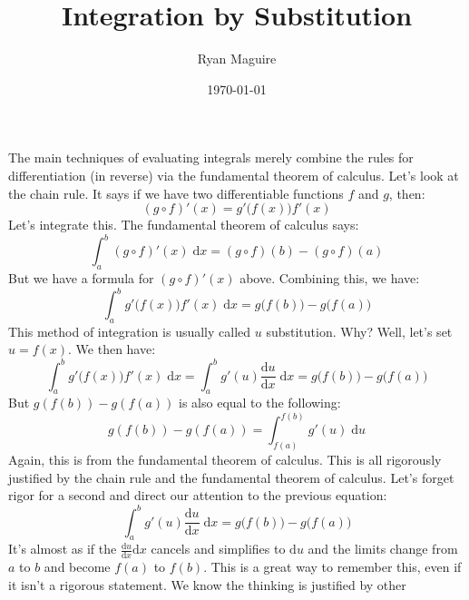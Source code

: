 \documentclass{article}
\title{Integration by Substitution}
\author{Ryan Maguire}
\date{\today}
\begin{document}
    \maketitle
    The main techniques of evaluating integrals merely combine the rules for
    differentiation (in reverse) via the fundamental theorem of calculus. Let's
    look at the chain rule. It says if we have two differentiable functions
    $f$ and $g$, then:
    \begin{equation}
        (g\circ{f})'(x)=g'\big(f(x)\big)f'(x)
    \end{equation}
    Let's integrate this. The fundamental theorem of calculus says:
    \begin{equation}
        \int_{a}^{b}(g\circ{f})'(x)\;\textrm{d}x
            =(g\circ{f})(b)-(g\circ{f})(a)
    \end{equation}
    But we have a formula for $(g\circ{f})'(x)$ above. Combining this, we have:
    \begin{equation}
        \int_{a}^{b}g'\big(f(x)\big)f'(x)\;\textrm{d}x
            =g\big(f(b)\big)-g\big(f(a)\big)
    \end{equation}
    This method of integration is usually called $u$ substitution. Why?
    Well, let's set $u=f(x)$. We then have:
    \begin{equation}
        \int_{a}^{b}g'\big(f(x)\big)f'(x)\;\textrm{d}x
            =\int_{a}^{b}g'(u)\frac{\textrm{d}u}{\textrm{d}x}\;\textrm{d}x
            =g\big(f(b)\big)-g\big(f(a)\big)
    \end{equation}
    But $g(f(b))-g(f(a))$ is also equal to the following:
    \begin{equation}
        g(f(b))-g(f(a))=\int_{f(a)}^{f(b)}g'(u)\;\textrm{d}u
    \end{equation}
    Again, this is from the fundamental theorem of calculus. This is all
    rigorously justified by the chain rule and the fundamental theorem of
    calculus. Let's forget rigor for a second and direct our attention to the
    previous equation:
    \begin{equation}
        \int_{a}^{b}g'(u)\frac{\textrm{d}u}{\textrm{d}x}\;\textrm{d}x
            =g\big(f(b)\big)-g\big(f(a)\big)
    \end{equation}
    It's almost as if the $\frac{\textrm{d}u}{\textrm{d}x}\textrm{d}x$ cancels
    and simplifies to $\textrm{d}u$ and the limits change from $a$ to $b$ and
    become $f(a)$ to $f(b)$. This is a great way to remember this, even if it
    isn't a rigorous statement. We know the thinking is justified by other
\end{document}

